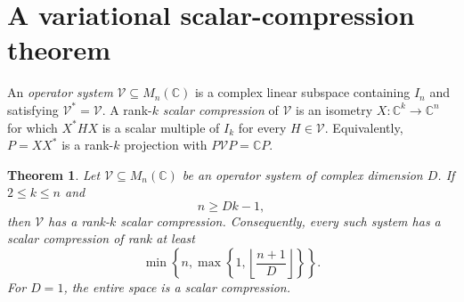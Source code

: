 \documentclass[11pt]{article}
\newcommand{\C}{\mathbb C}
\newcommand{\V}{\mathcal V}
\newtheorem{theorem}{Theorem}[section]
\theoremstyle{remark}
\numberwithin{equation}{section}
\begin{document}
\section{A variational scalar-compression theorem}\label{sec:variance}

An \emph{operator system} $\V\subseteq M_n(\C)$ is a complex linear
subspace containing $I_n$ and satisfying $\V^*=\V$. A rank-$k$
\emph{scalar compression} of $\V$ is an isometry
$X:\C^k\longrightarrow\C^n$ for which $X^*HX$ is a scalar multiple
of $I_k$ for every $H\in\V$. Equivalently, $P=XX^*$ is a rank-$k$
projection with $P\V P=\C P$.

\begin{theorem}\label{thm:compression}
Let $\V\subseteq M_n(\C)$ be an operator system of complex dimension
$D$. If $2\le k\le n$ and
\begin{equation}\label{eq:threshold}
 n\ge Dk-1,
\end{equation}
then $\V$ has a rank-$k$ scalar compression. Consequently, every such
system has a scalar compression of rank at least
\begin{equation}\label{eq:rank-bound}
 \min\!\left\{n,\max\!\left\{1,
 \left\lfloor\frac{n+1}{D}\right\rfloor\right\}\right\}.
\end{equation}
For $D=1$, the entire space is a scalar compression.
\end{theorem}
\end{document}
